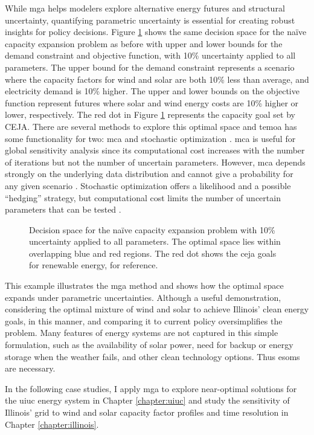While \gls{mga} helps modelers explore alternative energy futures and structural
uncertainty, quantifying parametric uncertainty is essential for creating robust insights
for policy decisions. Figure \ref{fig:param-fig} shows the same decision space for
the na\"{i}ve capacity expansion problem as before with upper and lower bounds for
the demand constraint and objective function, with 10\% uncertainty applied to all
parameters. The upper bound for the demand constraint represents a scenario where
the capacity factors for wind and solar are both 10\% less than average, and electricity
demand is 10\% higher. The upper and lower bounds on the objective function represent
futures where solar and wind energy costs are 10\% higher or lower, respectively. The
red dot in Figure \ref{fig:param-fig} represents the
capacity goal set by CEJA. There are several methods to explore this optimal space and
\gls{temoa} has some functionality for two: \gls{mca} \cite{yue_review_2018} and
stochastic optimization \cite{decarolis_multi-stage_2012, bennett_extending_2021}.
\gls{mca} is useful for global sensitivity analysis since its computational
cost increases with the number of iterations but not the number of uncertain
parameters. However, \gls{mca} depends strongly on the underlying data distribution
and cannot give a probability for any given scenario \cite{yue_review_2018}.
Stochastic optimization offers a likelihood and a possible ``hedging'' strategy,
but computational cost limits the number of uncertain parameters that can be
tested \cite{yue_review_2018}.

\begin{figure}[H]
  \centering
  \resizebox{0.8\columnwidth}{!}{}
  \caption{Decision space for the na\"{i}ve capacity expansion problem with
  10\% uncertainty applied to all parameters. The optimal space lies within
  overlapping blue and red regions. The red dot shows the \gls{ceja} goals for
  renewable energy, for reference.}
  \label{fig:param-fig}
\end{figure}

This example illustrates the \gls{mga} method and shows how the optimal space
expands under parametric uncertainties.
Although a useful demonstration, considering the optimal mixture of wind and solar
to achieve Illinois' clean energy goals, in this manner, and comparing it to
current policy oversimplifies the problem.
Many features of energy systems are not captured in this simple formulation,
such as the availability of solar power, need for backup or energy storage when
the weather fails, and other clean technology options. Thus \glspl{esom} are necessary.

In the following case studies, I apply \gls{mga} to explore near-optimal solutions
for the \gls{uiuc} energy system in Chapter \ref{chapter:uiuc} and study the
sensitivity of Illinois' grid to wind and solar capacity factor profiles and time
resolution in Chapter \ref{chapter:illinois}.
